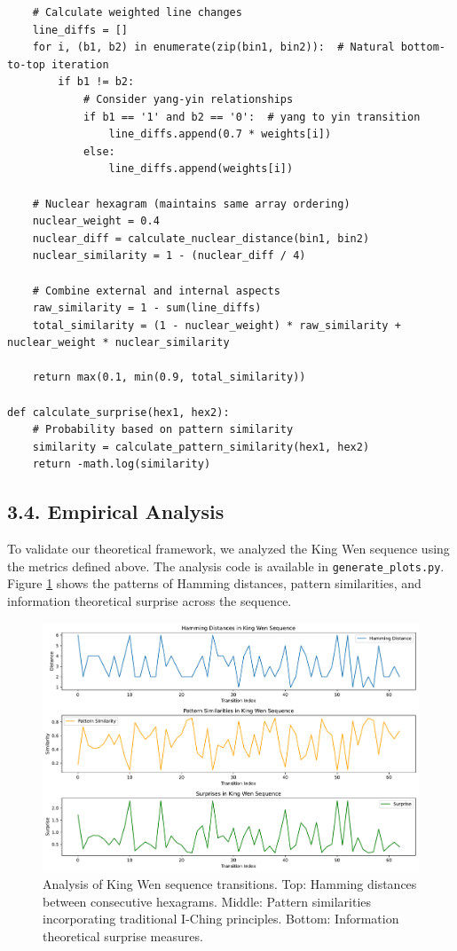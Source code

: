\documentclass{article}
\newenvironment{Shaded}{\begin{snugshade}}{\end{snugshade}}
\begin{document}
\begin{Shaded}
\begin{verbatim}
    # Calculate weighted line changes
    line_diffs = []
    for i, (b1, b2) in enumerate(zip(bin1, bin2)):  # Natural bottom-to-top iteration
        if b1 != b2:
            # Consider yang-yin relationships
            if b1 == '1' and b2 == '0':  # yang to yin transition
                line_diffs.append(0.7 * weights[i])
            else:
                line_diffs.append(weights[i])
    
    # Nuclear hexagram (maintains same array ordering)
    nuclear_weight = 0.4
    nuclear_diff = calculate_nuclear_distance(bin1, bin2)
    nuclear_similarity = 1 - (nuclear_diff / 4)
    
    # Combine external and internal aspects
    raw_similarity = 1 - sum(line_diffs)
    total_similarity = (1 - nuclear_weight) * raw_similarity + nuclear_weight * nuclear_similarity
    
    return max(0.1, min(0.9, total_similarity))

def calculate_surprise(hex1, hex2):
    # Probability based on pattern similarity
    similarity = calculate_pattern_similarity(hex1, hex2)
    return -math.log(similarity)
\end{verbatim}
\end{Shaded}

\subsection{3.4. Empirical Analysis}

To validate our theoretical framework, we analyzed the King Wen sequence using the metrics defined above. The analysis code is available in \texttt{generate\_plots.py}. Figure \ref{fig:metrics} shows the patterns of Hamming distances, pattern similarities, and information theoretical surprise across the sequence.

\begin{figure}[h]
\centering
\includegraphics[width=\textwidth]{king_wen_metrics.pdf}
\caption{Analysis of King Wen sequence transitions. Top: Hamming distances between consecutive hexagrams. Middle: Pattern similarities incorporating traditional I-Ching principles. Bottom: Information theoretical surprise measures.}
\label{fig:metrics}
\end{figure}
\end{document}
